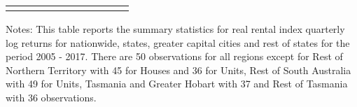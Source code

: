 \begin{table}[!ht]
{\begin{threeparttable}
\begin{tabular}{llHccHccHcc}
 
  
\bottomrule \\[-1.8ex] 

\end{tabular} 

\begin{tablenotes}
  \LARGE
        Notes: This table reports the summary statistics for real rental index quarterly log returns for nationwide, states, greater capital cities and rest of states for the period 2005 - 2017. There are 50 observations for all regions except for Rest of Northern Territory with 45 for Houses and 36 for Units, Rest of South Australia with 49 for Units, Tasmania and Greater Hobart with 37 and Rest of Tasmania with 36 observations.
\end{tablenotes}    



\end{threeparttable}
  }
  
  
  
\end{table}%

